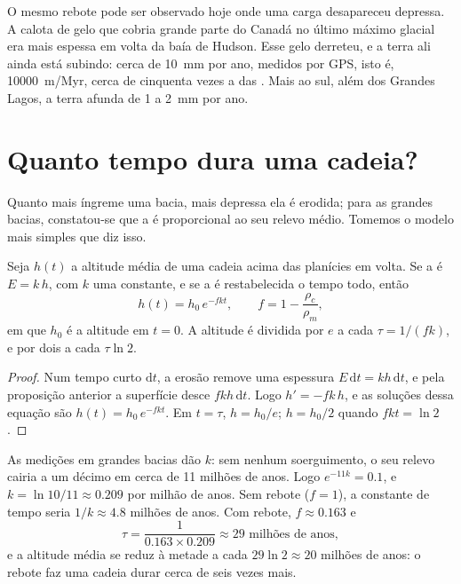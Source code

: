 O mesmo rebote pode ser observado hoje onde uma carga desapareceu depressa.
A calota de gelo que cobria grande parte do Canadá no último máximo glacial
era mais espessa em volta da baía de Hudson. Esse gelo derreteu, e a terra
ali ainda está subindo: cerca de \qty{10}{mm} por ano, medidos por GPS, isto
é, \qty{10000}{m/Myr}, cerca de cinquenta vezes a 
das . Mais ao sul,
além dos Grandes Lagos, a terra afunda de 1 a \qty{2}{mm} por ano.

\section{Quanto tempo dura uma cadeia?}

Quanto mais íngreme uma bacia, mais depressa ela é erodida; para as grandes
bacias, constatou-se que a  é proporcional ao seu relevo
médio. Tomemos o modelo mais simples que diz isso.

\begin{proposition}\label{prop:g12:destruction-of-mountains:decay}
Seja $h(t)$ a altitude média de uma cadeia acima das planícies em volta. Se
a  é $E = k\,h$, com $k$ uma constante, e se a  é
restabelecida o tempo todo, então
\[
  h(t) = h_0\, e^{-f k t}, \qquad f = 1 - \frac{\rho_c}{\rho_m},
\]
em que $h_0$ é a altitude em $t = 0$. A altitude é dividida por $e$
a cada $\tau = 1/(fk)$, e por dois a cada $\tau \ln 2$.
\end{proposition}

\begin{proof}
Num tempo curto $\mathrm{d}t$, a erosão remove uma espessura $E\,\mathrm{d}t
= k h\,\mathrm{d}t$, e pela proposição anterior a superfície desce
$f k h\,\mathrm{d}t$. Logo $h' = -fk\,h$, e as soluções dessa
equação são $h(t) = h_0\,e^{-fkt}$. Em $t = \tau$, $h = h_0/e$; $h = h_0/2$
quando $fkt = \ln 2$.
\end{proof}

As medições em grandes bacias dão $k$: sem nenhum soerguimento, o seu relevo
cairia a um décimo em cerca de 11 milhões de anos. Logo $e^{-11k} = 0.1$, e
$k =
\ln 10/11 \approx 0.209$ por milhão de anos. Sem rebote ($f = 1$), a
constante de tempo seria $1/k \approx 4.8$ milhões de anos. Com rebote, $f
\approx 0.163$ e
\[
  \tau = \frac{1}{0.163 \times 0.209} \approx 29 \text{ milhões de anos},
\]
e a altitude média se reduz à metade a cada $29 \ln 2 \approx 20$ milhões
de anos: o rebote faz uma cadeia durar cerca de seis vezes mais.

